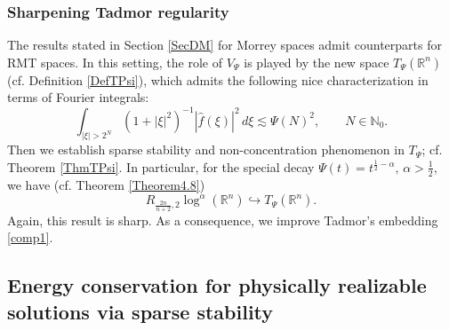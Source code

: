\documentclass[11pt, a4paper,leqno]{amsart}
\theoremstyle{plain}
\numberwithin{equation}{section}
\theoremstyle{definition}
\theoremstyle{remark}
\def\R{\mathbb{R}}
\begin{document}
\subsubsection{Sharpening Tadmor regularity} The results stated in Section \ref{SecDM} for Morrey spaces admit counterparts for RMT spaces. In this setting, the role of $V_\Psi$ is played by the new space  $T_\Psi(\R^n)$ (cf. Definition \ref{DefTPsi}), which admits the following nice characterization in terms of Fourier integrals: 
$$
	\int_{|\xi| > 2^N} (1+|\xi|^{2})^{-1} |\widehat{f}(\xi)|^2 \, d \xi \lesssim \Psi(N)^2, \qquad N \in \mathbb{N}_0.
$$
Then we establish sparse stability and non-concentration phenomenon in $T_\Psi$; cf. Theorem \ref{ThmTPsi}.  In particular, for the special decay $\Psi(t) = t^{\frac{1}{2}-\alpha}, \, \alpha > \frac{1}{2}$, we have (cf. Theorem \ref{Theorem4.8})
$$
	R_{\frac{2 n}{n+2}, 2} \log^\alpha(\R^n) \hookrightarrow T_\Psi(\R^n). 
$$
Again, this result is sharp. As a consequence, we improve Tadmor's embedding \eqref{comp1}.



%

\subsection{Energy conservation for physically realizable solutions via sparse stability}
\end{document}
